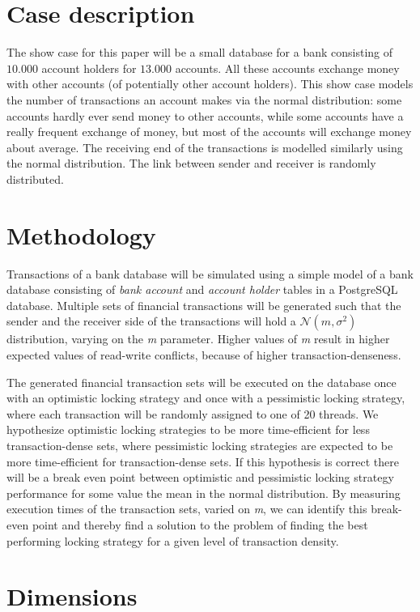 \documentclass{sig-alternate-br}
\begin{document}
\section{Case description}
\label{sec:case}
The show case for this paper will be a small database for a bank consisting of $10.000$ account holders for $13.000$ accounts. All these accounts exchange money with other accounts (of potentially other account holders). This show case models the number of transactions an account makes via the normal distribution: some accounts hardly ever send money to other accounts, while some accounts have a really frequent exchange of money, but most of the accounts will exchange money about average. The receiving end of the transactions is modelled similarly using the normal distribution. The link between sender and receiver is randomly distributed.

\section{Methodology}
\label{sec:methodology}
Transactions of a bank database will be simulated using a simple model of a bank database consisting of \emph{bank account} and \emph{account holder} tables in a PostgreSQL database. Multiple sets of financial transactions will be generated such that the sender and the receiver side of the transactions will hold a $\mathcal{N} (m,\sigma^2)$ distribution, varying on the \emph{m} parameter. Higher values of \emph{m} result in higher expected values of read-write conflicts, because of higher transaction-denseness. 

The generated financial transaction sets will be executed on the database once with an optimistic locking strategy and once with a pessimistic locking strategy, where each transaction will be randomly assigned to one of 20 threads. We hypothesize optimistic locking strategies to be more time-efficient for less transaction-dense sets, where pessimistic locking strategies are expected to be more time-efficient for transaction-dense sets. If this hypothesis is correct there will be a break even point between optimistic and pessimistic locking strategy performance for some value the mean in the normal distribution. By measuring execution times of the transaction sets, varied on \emph{m}, we can identify this break-even point and thereby find a solution to the problem of finding the best performing locking strategy for a given level of transaction density. 

\section{Dimensions}
\end{document}

